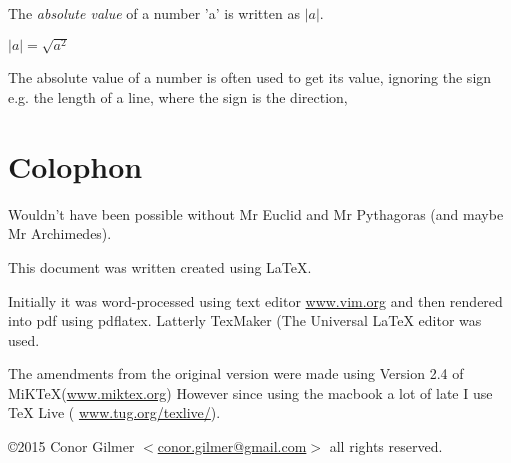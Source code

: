 \documentclass{article}
\begin{document}
The \textit{absolute value} of a number 'a' is written as $|a|$.

$ |a| = \sqrt{a^{2}}$ 

The absolute value of a number is often used to get its value, ignoring the sign e.g. the length of a line, where the sign is the direction,

\newpage
\section{Colophon}

Wouldn't have been possible without Mr Euclid and Mr Pythagoras (and maybe Mr Archimedes).

This document was written created using \LaTeX{}. 

Initially it was word-processed using text editor \href{http://www.vim.org}{www.vim.org} and then rendered into pdf using pdflatex. Latterly TexMaker (The Universal LaTeX editor was used.

The amendments from the original version were made using Version 2.4 of MiKTeX(\href{http://www.miktex.org}{www.miktex.org})
However since using the macbook a lot of late I use \TeX{} Live ( \href{https://www.tug.org/texlive/}{www.tug.org/texlive/}).





\copyright 2015 Conor Gilmer $<$\href{mailto:conor.gilmer@gmail.com}{conor.gilmer@gmail.com}$>$ all rights reserved.
\end{document}
